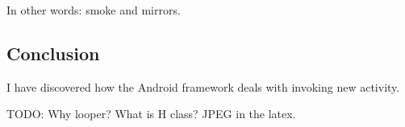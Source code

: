 \documentclass[11pt,a4paper]{article}
\begin{document}
In other words: smoke and mirrors.

\subsection{Conclusion}

I have discovered how the Android framework deals with invoking new activity.

TODO:
Why looper? What is H class? JPEG in the latex.
\end{document}
